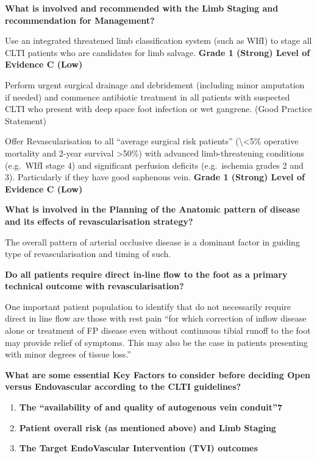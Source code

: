\documentclass[
]{book}
\begin{document}
\textbf{What is involved and recommended with the Limb Staging and
recommendation for Management?}

Use an integrated threatened limb classification system (such as WIfI)
to stage all CLTI patients who are candidates for limb salvage. \textbf{Grade
1 (Strong) Level of Evidence C (Low)}

Perform urgent surgical drainage and debridement (including minor
amputation if needed) and commence antibiotic treatment in all patients
with suspected CLTI who present with deep space foot infection or wet
gangrene. (Good Practice Statement)

Offer Revascularisation to all ``average surgical risk patients'' (\textbackslash\textless5\%
operative mortality and 2-year survival \textgreater50\%) with advanced
limb-threatening conditions (e.g.~WIfI stage 4) and significant
perfusion deficits (e.g.~ischemia grades 2 and 3). Particularly if they
have good saphenous vein. \textbf{Grade 1 (Strong) Level of Evidence C (Low)}
\citep{adam2005, norgren2007}

\textbf{What is involved in the Planning of the Anatomic pattern of disease
and its effects of revascularisation strategy?}

The overall pattern of arterial occlusive disease is a dominant factor
in guiding type of revascularisation and timing of such.

\textbf{Do all patients require direct in-line flow to the foot as a primary
technical outcome with revascularisation?}

One important patient population to identify that do not necessarily
require direct in line flow are those with rest pain ``for which
correction of inflow disease alone or treatment of FP disease even
without continuous tibial runoff to the foot may provide relief of
symptoms. This may also be the case in patients presenting with minor
degrees of tissue loss.''

\textbf{What are some essential Key Factors to consider before deciding Open
versus Endovascular according to the CLTI guidelines?}

\begin{enumerate}
\def\labelenumi{\arabic{enumi}.}
\item
  \textbf{The ``availability of and quality of autogenous vein conduit''7}
\item
  \textbf{Patient overall risk (as mentioned above) and Limb Staging}
\item
  \textbf{The Target EndoVascular Intervention (TVI) outcomes}
\end{enumerate}
\end{document}
